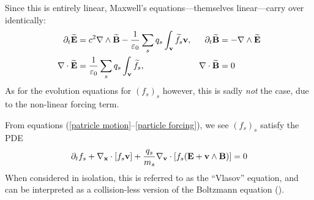     Since this is entirely linear, Maxwell's equations—themselves linear—carry over identically:
    \begin{align*}
        \partial_{t}\widetilde{\mathbf{E}}  &=  c^{2}\nabla\wedge\widetilde{\mathbf{B}} - \frac{1}{\varepsilon_{0}}\sum_{s}q_{s}\int_{\mathbf{v}}\widetilde{f_{s}}\mathbf{v},  &
        \partial_{t}\widetilde{\mathbf{B}}  &=  - \nabla\wedge\widetilde{\mathbf{E}}  \\
        \nabla\cdot\widetilde{\mathbf{E}}  &=  \frac{1}{\varepsilon_{0}}\sum_{s}q_{s}\int_{\mathbf{v}}\widetilde{f_{s}},  &
        \nabla\cdot\widetilde{\mathbf{B}}  &=  0
    \end{align*}
    As for the evolution equations for $(f_{s})_{s}$ however, this is sadly \emph{not} the case, due to the non-linear forcing term. 


    From equations (\ref{patricle motion}–\ref{particle forcing}), we see $(f_{s})_{s}$ satisfy the PDE
    \begin{equation}
        \partial_{t}f_{s} + \nabla_{\mathbf{x}}\cdot[f_{s}\mathbf{v}] + \frac{q_{s}}{m_{s}}\nabla_{\mathbf{v}}\cdot[f_{s}(\mathbf{E} + \mathbf{v}\wedge\mathbf{B})]  =  0
    \end{equation}
    When considered in isolation, this is referred to as the ``Vlasov'' equation, and can be interpreted as a collision-less version of the Boltzmann equation ().

    